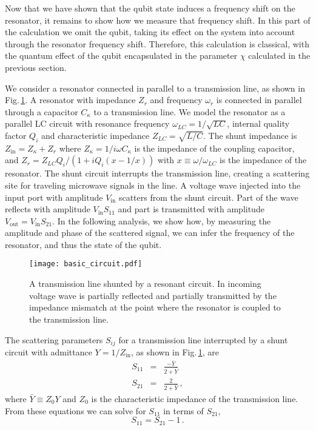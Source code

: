 
Now that we have shown that the qubit state induces a frequency shift on the resonator, it remains to show how we measure that frequency shift.
In this part of the calculation we omit the qubit, taking its effect on the system into account through the resonator frequency shift.
Therefore, this calculation is classical, with the quantum effect of the qubit encapsulated in the parameter $\chi$ calculated in the previous section.

We consider a resonator connected in parallel to a transmission line, as shown in Fig.\,\ref{Fig:scatteringDiagram}.
A resonator with impedance $Z_r$ and frequency $\omega_r$ is connected in parallel through a capacitor $C_{\kappa}$ to a transmission line.
We model the resonator as a parallel LC circuit with resonance frequency $\omega_{LC}=1/\sqrt{LC}$, internal quality factor $Q_i$ and characteristic impedance $Z_{LC}=\sqrt{L/C}$.
The shunt impedance is $Z_{\text{in}}=Z_{\kappa} + Z_r$ where $Z_{\kappa} = 1/i\omega C_{\kappa}$ is the impedance of the coupling capacitor, and $Z_r = Z_{LC}Q_i/(1+iQ_i(x-1/x))$ with $x \equiv \omega/\omega_{LC}$ is the impedance of the resonator.
The shunt circuit interrupts the transmission line, creating a scattering site for traveling microwave signals in the line.
A voltage wave injected into the input port with amplitude $V_{\textrm{in}}$ scatters from the shunt circuit.
Part of the wave reflects with amplitude $V_{\textrm{in}}S_{11}$ and part is transmitted with amplitude $V_{\textrm{out}}=V_{\textrm{in}}S_{21}$.
In the following analysis, we show how, by measuring the amplitude and phase of the scattered signal, we can infer the frequency of the resonator, and thus the state of the qubit.

\begin{figure}
\begin{centering}
\texttt{[image: basic\_circuit.pdf]} 
\par\end{centering}
\caption{A transmission line shunted by a resonant circuit. In incoming voltage wave is partially reflected and partially transmitted by the impedance mismatch at the point where the resonator is coupled to the transmission line.}
\label{Fig:scatteringDiagram}
\end{figure}

The scattering parameters $S_{ij}$ for a transmission line interrupted by a shunt circuit with admittance $Y=1/Z_{\text{in}}$, as shown in Fig.\,\ref{Fig:scatteringDiagram}, are \cite{Pozar:microwaveEngineering2009} \begin{eqnarray}
S_{11} &=& \frac{-\bar{Y}}{2+\bar{Y}} \label{eq:S11_Y} \\
S_{21} &=& \frac{2}{2+\bar{Y}} \, , \label{eq:S21_Y} \end{eqnarray}
where $\bar{Y} \equiv Z_0 Y$ and $Z_0$ is the characteristic impedance of the transmission line.
From these equations we can solve for $S_{11}$ in terms of $S_{21}$, \begin{equation}
S_{11} = S_{21} - 1 \, . \label{eq:S11S21} \end{equation}


